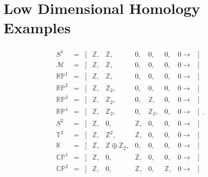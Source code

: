 \hypertarget{low-dimensional-homology-examples}{%
\section{Low Dimensional Homology
Examples}\label{low-dimensional-homology-examples}}

\begin{align*} \begin{array}{cccccccccc} S^1   &=  &[&{\mathbb{Z}}, &{\mathbb{Z}},               &0,    &0,      &0,    &0\rightarrow & ]\\ {\mathcal{M}}&=  &[&{\mathbb{Z}}, &{\mathbb{Z}},               &0,    &0,      &0,    &0\rightarrow & ]\\ {\mathbb{RP}}^1 &=  &[&{\mathbb{Z}}, &{\mathbb{Z}},               &0,    &0,      &0,    &0\rightarrow & ]\\ {\mathbb{RP}}^2 &=  &[&{\mathbb{Z}}, &{\mathbb{Z}}_2,             &0,    &0,      &0,    &0\rightarrow & ]\\ {\mathbb{RP}}^3 &=  &[&{\mathbb{Z}}, &{\mathbb{Z}}_2,             &0,    &{\mathbb{Z}},    &0,    &0\rightarrow & ]\\ {\mathbb{RP}}^4 &=  &[&{\mathbb{Z}}, &{\mathbb{Z}}_2,             &0,    &{\mathbb{Z}}_2,  &0,    &0\rightarrow & ]\\  S^2  &=  &[&{\mathbb{Z}}, &0,                 &{\mathbb{Z}},  &0,      &0,    &0\rightarrow & ]\\ {\mathbb{T}}^2 &=  &[&{\mathbb{Z}}, &{\mathbb{Z}}^2,             &{\mathbb{Z}},  &0,      &0,    &0\rightarrow & ]\\ {\mathbb{K}}&=  &[&{\mathbb{Z}}, &{\mathbb{Z}}\oplus {\mathbb{Z}}_2,  &0,    &0,      &0,    &0\rightarrow & ]\\ {\mathbb{CP}}^1 &=  &[&{\mathbb{Z}}, &0,                 &{\mathbb{Z}},  &0,      &0,    &0\rightarrow & ]\\ {\mathbb{CP}}^2 &=  &[&{\mathbb{Z}}, &0,                 &{\mathbb{Z}},  &0,      &{\mathbb{Z}},  &0\rightarrow & ]\\ \end{array} .\end{align*}

\scriptsize


